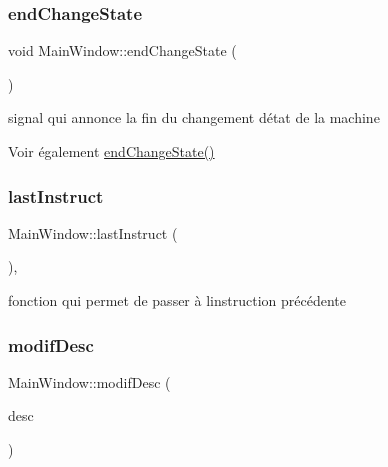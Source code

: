 \subsubsection{\texorpdfstring{end\+Change\+State}{endChangeState}}
{\footnotesize\ttfamily void Main\+Window\+::end\+Change\+State (\begin{DoxyParamCaption}{ }\end{DoxyParamCaption})\hspace{0.3cm}{\ttfamily [signal]}}



signal qui annonce la fin du changement d\textquotesingle{}état de la machine 

\begin{DoxySeeAlso}{Voir également}
\hyperlink{classMainWindow_a2cd7fd54c497cd6a073ad43857266890}{end\+Change\+State()} 
\end{DoxySeeAlso}
\mbox{\label{classMainWindow_a715f753a6c46e3f10565a5a1b849ee86}} 
\subsubsection{\texorpdfstring{last\+Instruct}{lastInstruct}}
{\footnotesize\ttfamily Main\+Window\+::last\+Instruct (\begin{DoxyParamCaption}{ }\end{DoxyParamCaption})\hspace{0.3cm}{\ttfamily [private]}, {\ttfamily [slot]}}



fonction qui permet de passer à l\textquotesingle{}instruction précédente 

\mbox{\label{classMainWindow_a8c1e21671da1da3ebb91417ed1745ac2}} 
\subsubsection{\texorpdfstring{modif\+Desc}{modifDesc}}
{\footnotesize\ttfamily Main\+Window\+::modif\+Desc (\begin{DoxyParamCaption}\item[{Q\+String}]{desc }\end{DoxyParamCaption})\hspace{0.3cm}{\ttfamily [slot]}}



